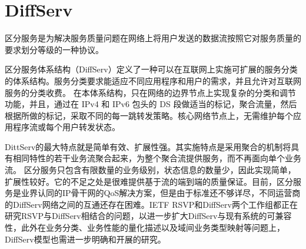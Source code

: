 \section{DiffServ}
区分服务是为解决服务质量问题在网络上将用户发送的数据流按照它对服务质量的要求划分等级的一种协议。

区分服务体系结构（DiffServ）定义了一种可以在互联网上实施可扩展的服务分类的体系结构。服务分类要求能适应不同应用程序和用户的需求，并且允许对互联网服务的分类收费。
在本体系结构，只在网络的边界节点上实现复杂的分类和调节功能，并且，通过在 IPv4 和 IPv6 包头的 DS 段做适当的标记，聚合流量，然后根据所做的标记，采取不同的每一跳转发策略。核心网络节点上，无需维护每个应用程序流或每个用户转发状态。

DittServ的最大特点就是简单有效、扩展性强。其实施特点是采用聚合的机制将具有相同特性的若干业务流聚合起来，为整个聚合流提供服务，而不再面向单个业务流。
区分服务只包含有限数量的业务级别，状态信息的数量少，因此实现简单，扩展性较好。它的不足之处是很难提供基于流的端到端的质量保证。目前，区分服务是业界认同的IP骨干网的QoS解决方案，但是由于标准还不够详尽，不同运营商的DiffServ网络之间的互通还存在困难。IETF RSVP和DiffServ两个工作组都正在研究RSVP与DiffServ相结合的问题，以进一步扩大DiffServ与现有系统的可兼容性，此外在业务分类、业务性能的量化描述以及域间业务类型映射等问题上，DiffServ模型也需进一步明确和开展的研究。



